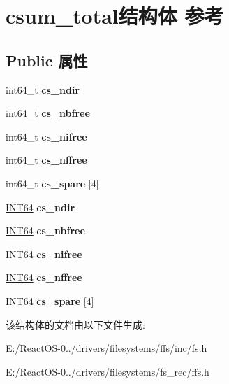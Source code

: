 \hypertarget{structcsum__total}{}\section{csum\+\_\+total结构体 参考}
\label{structcsum__total}
\subsection*{Public 属性}
\begin{DoxyCompactItemize}
\item 
\mbox{\label{structcsum__total_ace49dca16f94651c7e9b1df65d8197d9}} 
int64\+\_\+t {\bfseries cs\+\_\+ndir}
\item 
\mbox{\label{structcsum__total_ac41c6231e09b4ca0b7fd2fe16d73abee}} 
int64\+\_\+t {\bfseries cs\+\_\+nbfree}
\item 
\mbox{\label{structcsum__total_a804f2ae79c647da155cbd6ea5952b3b3}} 
int64\+\_\+t {\bfseries cs\+\_\+nifree}
\item 
\mbox{\label{structcsum__total_a6d734f6ae45524cb242fb899168cc1e6}} 
int64\+\_\+t {\bfseries cs\+\_\+nffree}
\item 
\mbox{\label{structcsum__total_a08730d7da1a7f2dd78e15224dbdfe9d1}} 
int64\+\_\+t {\bfseries cs\+\_\+spare} \mbox{[}4\mbox{]}
\item 
\mbox{\label{structcsum__total_ae336e4fd036d4d459e2de7fa5f14e9df}} 
\hyperlink{_processor_bind_8h_af16992cf571ce4103a92355761cc471e}{I\+N\+T64} {\bfseries cs\+\_\+ndir}
\item 
\mbox{\label{structcsum__total_ad8cf282939062d3792e0244fa69dc437}} 
\hyperlink{_processor_bind_8h_af16992cf571ce4103a92355761cc471e}{I\+N\+T64} {\bfseries cs\+\_\+nbfree}
\item 
\mbox{\label{structcsum__total_a979b5125892708df13d84f1f8e7905a9}} 
\hyperlink{_processor_bind_8h_af16992cf571ce4103a92355761cc471e}{I\+N\+T64} {\bfseries cs\+\_\+nifree}
\item 
\mbox{\label{structcsum__total_a97ba7c74cd577e644216551b5257a93b}} 
\hyperlink{_processor_bind_8h_af16992cf571ce4103a92355761cc471e}{I\+N\+T64} {\bfseries cs\+\_\+nffree}
\item 
\mbox{\label{structcsum__total_abba72dd8c983b21ffd7ceeb2aed582ba}} 
\hyperlink{_processor_bind_8h_af16992cf571ce4103a92355761cc471e}{I\+N\+T64} {\bfseries cs\+\_\+spare} \mbox{[}4\mbox{]}
\end{DoxyCompactItemize}


该结构体的文档由以下文件生成\+:\begin{DoxyCompactItemize}
\item 
E\+:/\+React\+O\+S-\/0../drivers/filesystems/ffs/inc/fs.\+h\item 
E\+:/\+React\+O\+S-\/0../drivers/filesystems/fs\+\_\+rec/ffs.\+h\end{DoxyCompactItemize}
